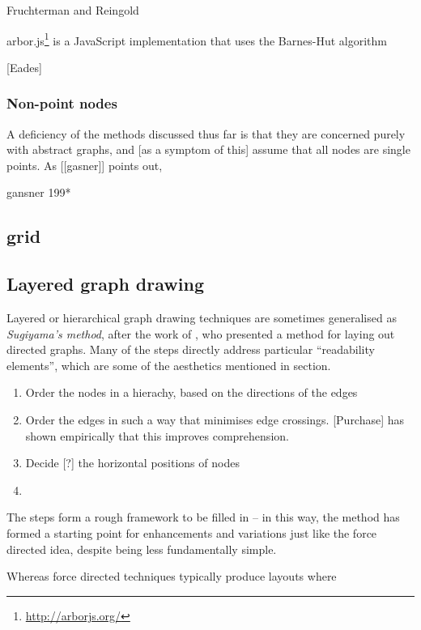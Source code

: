 Fruchterman and Reingold 

arbor.js\footnote{\url{http://arborjs.org/}} is a JavaScript implementation that uses the Barnes-Hut algorithm 

[Eades]

\citet{handbook:forcedir}

\subsubsection{Non-point nodes}

A deficiency of the methods discussed thus far is that they are concerned purely with abstract graphs, and [as a symptom of this] assume that all nodes are single points. As [[gasner]] points out, 


gansner 199*




\subsection{grid}




\subsection{Layered graph drawing}

Layered or hierarchical graph drawing techniques are sometimes generalised as \emph{Sugiyama's method}, after the work of \citet{4308636}, who presented a method for laying out directed graphs. Many of the steps directly address particular ``readability elements'', which are some of the aesthetics mentioned in section.

\begin{enumerate}
\item Order the nodes in a hierachy, based on the directions of the edges
\item Order the edges in such a way that minimises edge crossings. [Purchase] has shown empirically that this improves comprehension.
\item Decide [?] the horizontal positions of nodes
\item
\end{enumerate}

The steps form a rough framework to be filled in -- in this way, the method has formed a starting point for enhancements and variations just like the force directed idea, despite being less fundamentally simple.

Whereas force directed techniques typically produce layouts where 


